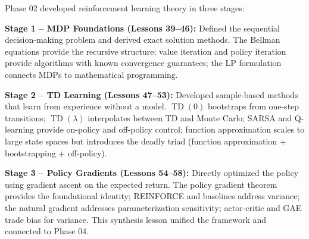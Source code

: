 \documentclass[11pt,a4paper]{article}
\begin{document}
\begin{keyresult}[title={Phase 02 Arc: From MDPs to Policy Gradients}]
Phase 02 developed reinforcement learning theory in three stages:

\textbf{Stage 1 -- MDP Foundations (Lessons 39--46):} Defined the
sequential decision-making problem and derived exact solution methods.
The Bellman equations provide the recursive structure; value iteration
and policy iteration provide algorithms with known convergence
guarantees; the LP formulation connects MDPs to mathematical
programming.

\textbf{Stage 2 -- TD Learning (Lessons 47--53):} Developed
sample-based methods that learn from experience without a model.
$\operatorname{TD}(0)$ bootstraps from one-step transitions;
$\operatorname{TD}(\lambda)$ interpolates between TD and Monte Carlo;
SARSA and Q-learning provide on-policy and off-policy control;
function approximation scales to large state spaces but introduces
the deadly triad (function approximation + bootstrapping + off-policy).

\textbf{Stage 3 -- Policy Gradients (Lessons 54--58):} Directly
optimized the policy using gradient ascent on the expected return.
The policy gradient theorem provides the foundational identity;
REINFORCE and baselines address variance; the natural gradient
addresses parameterization sensitivity; actor-critic and GAE trade
bias for variance. This synthesis lesson unified the framework and
connected to Phase 04.
\end{keyresult}
\end{document}
